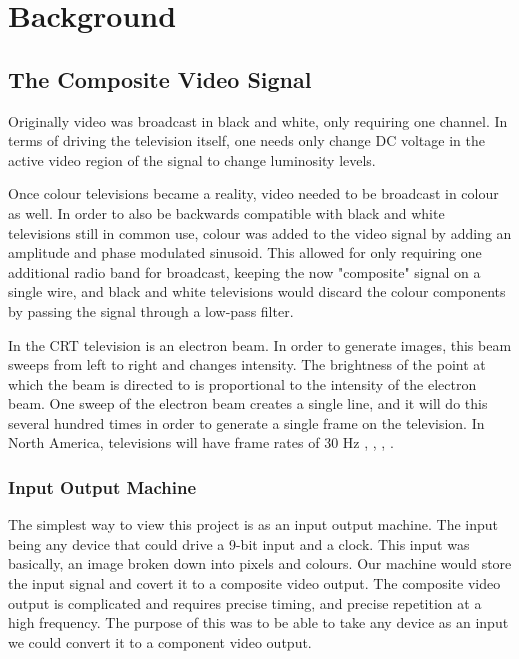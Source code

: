 \section{Background}

\subsection{The Composite Video Signal}

Originally video was broadcast in black and white, only requiring one channel.
In terms of driving the television itself, one needs only change DC voltage in
the active video region of the signal to change luminosity levels.

Once colour televisions became a reality, video needed to be broadcast in colour
as well. In order to also be backwards compatible with black and white
televisions still in common use, colour was added to the video signal by adding
an amplitude and phase modulated sinusoid. This allowed for only requiring one
additional radio band for broadcast, keeping the now "composite" signal on a
single wire, and black and white televisions would discard the colour components
by passing the signal through a low-pass filter.

In the CRT television is an electron beam. In order to generate images, this
beam sweeps from left to right and changes intensity. The brightness of the
point at which the beam is directed to is proportional to the intensity of the
electron beam. One sweep of the electron beam creates a single line, and it will
do this several hundred times in order to generate a single frame on the
television. In North America, televisions will have frame rates of 30 Hz
\cite{videoBasics}, \cite{analogVideo}, \cite{video101}, \cite{rastor}.

\subsubsection{Input Output Machine}

The simplest way to view this project is as an input output machine. The input
being any device that could drive a 9-bit input and a clock. This input was 
basically, an image broken down into pixels and colours. Our machine would 
store the input signal and covert it to a composite video output. The composite
video output is complicated and requires precise timing, and precise repetition 
at a high frequency. The purpose of this was to be able to take any device as 
an input we could convert it to a component video output.

